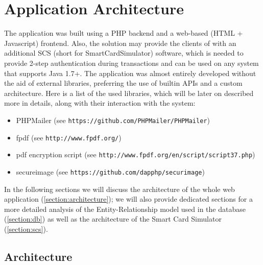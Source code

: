 \chapter{Application Architecture}\label{chapter:application_architecture}
The \gnb{} application was built using a PHP backend and a web-based (HTML + Javascript) frontend. Also, the solution may provide the clients of \gnb{} with an additional SCS (short for SmartCardSimulator) software, which is needed to provide 2-step authentication during transactions and can be used on any system that supports Java 1.7+.\newline
The application was almost entirely developed without the aid of external libraries, preferring the use of builtin APIs and a custom architecture. Here is a list of the used libraries, which will be later on described more in details, along with their interaction with the system:
\begin{itemize}
	\item PHPMailer (see \texttt{https://github.com/PHPMailer/PHPMailer})
	\item fpdf (see \texttt{http://www.fpdf.org/})
	\item pdf encryption script (see \texttt{http://www.fpdf.org/en/script/script37.php})
	\item secureimage (see \texttt{https://github.com/dapphp/securimage})
\end{itemize}


In the following sections we will discuss the architecture of the whole web application (\autoref{section:architecture}); we will also provide dedicated sections for a more detailed analysis of the Entity-Relationship model used in the database (\autoref{section:db}) as well as the architecture of the Smart Card Simulator (\autoref{section:scs}).

\clearpage
\section{Architecture}\label{section:architecture}

